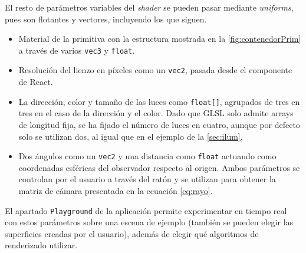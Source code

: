El resto de parámetros variables del \textit{shader} se pueden pasar mediante \textit{uniforms}, pues son flotantes y vectores, incluyendo los que siguen.
\begin{itemize}
    \item Material de la primitiva con la estructura mostrada en la \autoref{fig:contenedorPrim} a través de varios \texttt{vec3} y \texttt{float}. 
    \item Resolución del lienzo en píxeles como un \texttt{vec2}, pasada desde el componente de React.
    \item La dirección, color y tamaño de las luces como \texttt{float[]}, agrupados de tres en tres en el caso de la dirección y el color. Dado que GLSL solo admite arrays de longitud fija, se ha fijado el número de luces en cuatro, aunque por defecto solo se utilizan dos, al igual que en el ejemplo de la \autoref{sec:ilum},
    \item Dos ángulos como un \texttt{vec2} y una distancia como \texttt{float} actuando como coordenadas esféricas del observador respecto al origen. Ambos parámetros se controlan por el usuario a través del ratón y se utilizan para obtener la matriz de cámara presentada en la ecuación \eqref{eq:rayo}.
\end{itemize}
El apartado \texttt{Playground} de la aplicación permite experimentar en tiempo real con estos parámetros sobre una escena de ejemplo (también se pueden elegir las superficies creadas por el usuario), además de elegir qué algoritmos de renderizado utilizar.\newline


